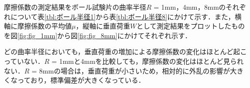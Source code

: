 摩擦係数の測定結果をボール試験片の曲率半径$R$ = 1mm，4mm，8mmのそれぞれについて表\ref{tbl:ボール半径1}から表\ref{tbl:ボール半径8}にかけて示す．また，横軸に摩擦係数の平均値$\mu$，縦軸に垂直荷重$W$として測定結果をプロットしたものを図\ref{fig:fig_1mm}から図\ref{fig:fig_8mm}にかけてそれぞれ示す．

どの曲率半径においても，垂直荷重の増加による摩擦係数の変化はほとんど起こっていない．$R$ = 1mmと4mmを比較しても，摩擦係数の変化はほとんど見られない．$R$ = 8mmの場合は，垂直荷重が小さいため，相対的に外乱の影響が大きくなっており，標準偏差が大きくなっている．

\begin{table}[htbp]
    \centering
    \caption{Coefficient of friction measurement results(R=1[mm]).}
    \label{tbl:ボール半径1}
\end{table}
\begin{table}[htbp]
    \centering
    \caption{Coefficient of friction measurement results(R=4[mm]).}
    \label{tbl:ボール半径4}
\end{table}
